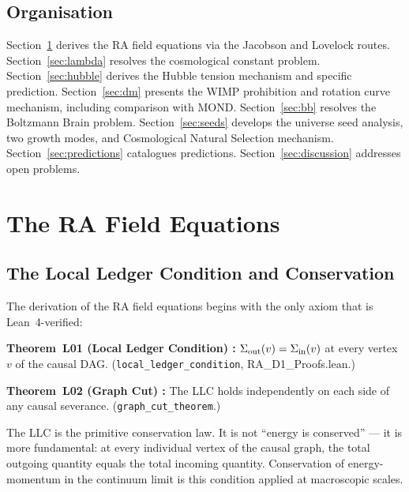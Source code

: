\documentclass[12pt,a4paper]{article}
\begin{document}
\subsection{Organisation}

Section~\ref{sec:GR} derives the RA field equations via the Jacobson and Lovelock routes.  Section~\ref{sec:lambda} resolves the cosmological constant problem.  Section~\ref{sec:hubble} derives the Hubble tension mechanism and specific prediction.  Section~\ref{sec:dm} presents the WIMP prohibition and rotation curve mechanism, including comparison with MOND.  Section~\ref{sec:bb} resolves the Boltzmann Brain problem.  Section~\ref{sec:seeds} develops the universe seed analysis, two growth modes, and Cosmological Natural Selection mechanism.  Section~\ref{sec:predictions} catalogues predictions.  Section~\ref{sec:discussion} addresses open problems.

\section{The RA Field Equations}\label{sec:GR}

\subsection{The Local Ledger Condition and Conservation}

The derivation of the RA field equations begins with the only axiom that is Lean~4-verified:

\begin{leanbox}
\textbf{Theorem~L01 (Local Ledger Condition) \statusLV:}
$\Sigma_{\rm out}(v) = \Sigma_{\rm in}(v)$ at every vertex $v$ of the causal DAG.  (\texttt{local\_ledger\_condition}, RA\_D1\_Proofs.lean.)

\textbf{Theorem~L02 (Graph Cut) \statusLV:}
The LLC holds independently on each side of any causal severance.  (\texttt{graph\_cut\_theorem}.)
\end{leanbox}

The LLC is the primitive conservation law.  It is not ``energy is conserved'' --- it is more fundamental: at every individual vertex of the causal graph, the total outgoing quantity equals the total incoming quantity.  Conservation of energy-momentum in the continuum limit is this condition applied at macroscopic scales.
\end{document}
